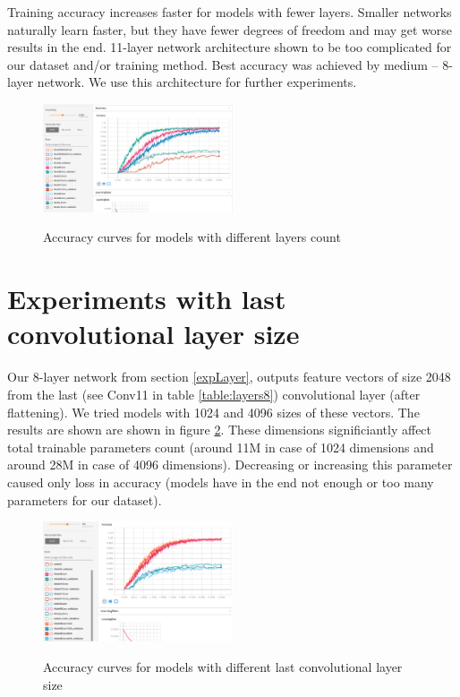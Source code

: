 \documentclass[a4paper]{article}
\begin{document}
Training accuracy increases faster for models with fewer layers.
Smaller networks naturally learn faster, but they have fewer degrees of freedom
and may get worse results in the end.
11-layer network architecture shown to be too complicated for
our dataset and/or training method.
Best accuracy was achieved by medium -- 8-layer network.
We use this architecture for further experiments.

\begin{figure}[!hbt]
    \centering
    \includegraphics[page=2,width=0.5\textwidth]{curvesLayers.png}
    \label{fig:layersAcc}
    \caption[]{Accuracy curves for models with different layers count}
\end{figure}

\section{Experiments with last convolutional layer size}

Our 8-layer network from section \ref{expLayer}, outputs
feature vectors of size 2048 from the last (see Conv11 in table \ref{table:layers8}) convolutional layer (after flattening).
We tried models with 1024 and 4096 sizes of these vectors.
The results are shown are shown in figure \ref{fig:lastSize}.
These dimensions significiantly affect total trainable parameters count
(around 11M in case of 1024 dimensions and around 28M in case of 4096 dimensions).
Decreasing or increasing this parameter caused only loss in accuracy
(models have in the end not enough or too many parameters for our dataset).

\begin{figure}[!hbt]
    \centering
    \includegraphics[page=2,width=0.5\textwidth]{lastConvSize.png}
    \label{fig:lastSize}
    \caption[]{Accuracy curves for models with different last convolutional layer size}
\end{figure}
\end{document}
